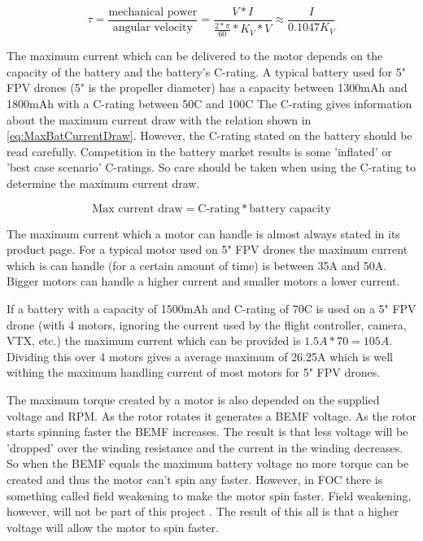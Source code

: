 \documentclass[]{report}
\begin{document}
\begin{equation} \label{eq:BldcTorqueEstimation}
	\tau = \frac{\text{mechanical power}}{\text{angular velocity}} = \frac{V*I}{\frac{2*\pi}{60}*K_V*V} \approx \frac{I}{0.1047K_V}
\end{equation}

The maximum current which can be delivered to the motor depends on the capacity of the battery and the battery's C-rating. A typical battery used for 5" FPV drones (5" is the propeller diameter) has a capacity between 1300mAh and 1800mAh with a C-rating between 50C and 100C The C-rating gives information about the maximum current draw with the relation shown in \autoref{eq:MaxBatCurrentDraw}. However, the C-rating stated on the battery should be read carefully. Competition in the battery market results is some 'inflated' or 'best case scenario' C-ratings. So care should be taken when using the C-rating to determine the maximum current draw.

\begin{equation} \label{eq:MaxBatCurrentDraw}
	\text{Max current draw} = \text{C-rating} * \text{battery capacity}
\end{equation}


The maximum current which a motor can handle is almost always stated in its product page. For a typical motor used on 5" FPV drones the maximum current which is can handle (for a certain amount of time) is between 35A and 50A. Bigger motors can handle a higher current and smaller motors a lower current.

If a battery with a capacity of 1500mAh and C-rating of 70C is used on a 5" FPV drone (with 4 motors, ignoring the current used by the flight controller, camera, VTX, etc.) the maximum current which can be provided is $1.5A * 70 = 105A$. Dividing this over 4 motors gives a average maximum of 26.25A which is well withing the maximum handling current of most motors for 5" FPV drones.

The maximum torque created by a motor is also depended on the supplied voltage and RPM. As the rotor rotates it generates a BEMF voltage. As the rotor starts spinning faster the BEMF increases. The result is that less voltage will be 'dropped' over the winding resistance and the current in the winding decreases. So when the BEMF equals the maximum battery voltage no more torque can be created and thus the motor can't spin any faster. However, in FOC there is something called field weakening to make the motor spin faster. Field weakening, however, will not be part of this project \cite{RCBLDC_Motor_Constants}. The result of this all is that a higher voltage will allow the motor to spin faster.
\end{document}
